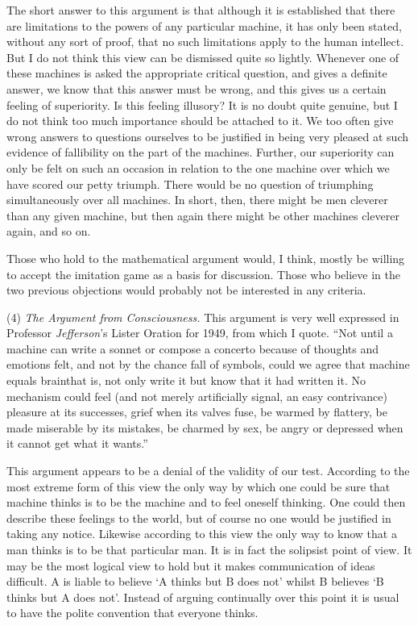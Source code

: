 \documentclass[10pt]{article} %
\begin{document}
The short answer to this argument is that although it is established that there are limitations to the powers of any particular machine, it has only been stated, without any sort of proof, that no such limitations apply to the human intellect. But I do not think this view can be dismissed quite so lightly. Whenever one of these machines is asked the appropriate critical question, and gives a definite answer, we know that this answer must be wrong, and this gives us a certain feeling of superiority. Is this feeling illusory? It is no doubt quite genuine, but I do not think too much importance should be attached to it. We too often give wrong answers to questions ourselves to be justified in being very pleased at such evidence of fallibility on the part of the machines. Further, our superiority can only be felt on such an occasion in relation to the one machine over which we have scored our petty triumph. There would be no question of triumphing simultaneously over all machines. In short, then, there might be men cleverer than any given machine, but then again there might be other machines cleverer again, and so on.

Those who hold to the mathematical argument would, I think, mostly be willing to accept the imitation game as a basis for discussion. Those who believe in the two previous objections would probably not be interested in any criteria.
\vspace{0.5\baselineskip} %

\noindent\normalfont (4) \textit{The Argument from Consciousness.} This argument is very well expressed in Professor \textit{Jefferson}'s Lister Oration for 1949, from which I quote. ``Not until a machine can write a sonnet or compose a concerto because of thoughts and emotions felt, and not by the chance fall of symbols, could we agree that machine equals brain\textemdash that is, not only write it but know that it had written it. No mechanism could feel (and not merely artificially signal, an easy contrivance) pleasure at its successes, grief when its valves fuse, be warmed by flattery, be made miserable by its mistakes, be charmed by sex, be angry or depressed when it cannot get what it wants.''

This argument appears to be a denial of the validity of our test. According to the most extreme form of this view the only way by which one could be sure that machine thinks is to be the machine and to feel oneself thinking. One could then describe these feelings to the world, but of course no one would be justified in taking any notice. Likewise according to this view the only way to know that a man thinks is to be that particular man. It is in fact the solipsist point of view. It may be the most logical view to hold but it makes communication of ideas difficult. A is liable to believe `A thinks but B does not' whilst B believes `B thinks but A does not'. Instead of arguing continually over this point it is usual to have the polite convention that everyone thinks.
\end{document}

